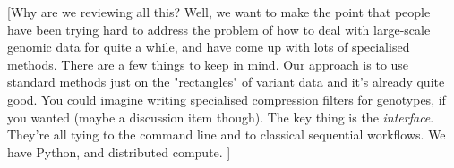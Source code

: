 \documentclass[9pt,lineno]{elife}
\begin{document}
[Why are we reviewing all this? Well, we want to make the point
that people have been trying hard to address the problem of
how to deal with large-scale genomic data for quite a while,
and have come up with lots of specialised methods. There
are a few things to keep in mind. Our approach is to use
standard methods just on the "rectangles" of variant data
and it's already quite good. You could imagine writing specialised
compression filters for genotypes, if you wanted (maybe a
discussion item though). The key thing is the \emph{interface}.
They're all tying to the command line and to classical
sequential workflows. We have Python, and distributed compute. ]



\end{document}
